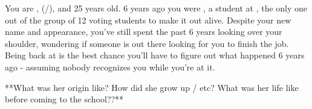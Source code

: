 \documentclass[char]{GL2020}
\begin{document}
\name{\cAssistantScientist{}}



You are \cAssistantScientist{}, (\cAssistantScientist{\they}/\cAssistantScientist{\them}), and 25 years old.  6 years ago you were \cKidScientist{}, a student at \cSch{}, the only one out of the group of 12 voting students to make it out alive.  Despite your new name and appearance, you've still spent the past 6 years looking over your shoulder, wondering if someone is out there looking for you to finish the job.  Being back at \pSc{} is the best chance you'll have to figure out what happened 6 years ago - assuming nobody recognizes you while you're at it.

**What was her origin like?  How did she grow up / etc?  What was her life like before coming to the school??**









\end{document}
